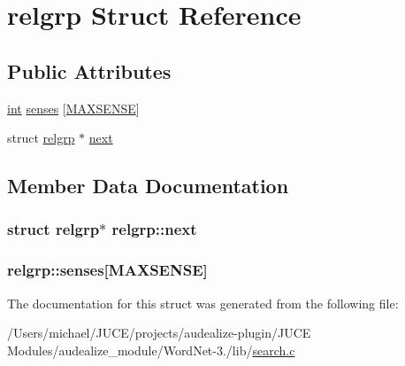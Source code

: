 \hypertarget{structrelgrp}{}\section{relgrp Struct Reference}
\label{structrelgrp}
\subsection*{Public Attributes}
\begin{DoxyCompactItemize}
\item 
\hyperlink{tk_8h_a83f82f76e7fed06f4c49d2db94028a6d}{int} \hyperlink{structrelgrp_adbaef9665fe24d3d15c9696c9cccc9b1}{senses} \mbox{[}\hyperlink{wn_8h_a42d3a85982c9dac42fdf1b7d9b2ddfd7}{M\+A\+X\+S\+E\+N\+SE}\mbox{]}
\item 
struct \hyperlink{structrelgrp}{relgrp} $\ast$ \hyperlink{structrelgrp_abf8e1b05d485e0585c143268293cdbb0}{next}
\end{DoxyCompactItemize}


\subsection{Member Data Documentation}
\subsubsection[{\texorpdfstring{next}{next}}]{\setlength{\rightskip}{0pt plus 5cm}struct {\bf relgrp}$\ast$ relgrp\+::next}\hypertarget{structrelgrp_abf8e1b05d485e0585c143268293cdbb0}{}\label{structrelgrp_abf8e1b05d485e0585c143268293cdbb0}
\subsubsection[{\texorpdfstring{senses}{senses}}]{ relgrp\+::senses\mbox{[}{\bf M\+A\+X\+S\+E\+N\+SE}\mbox{]}}\hypertarget{structrelgrp_adbaef9665fe24d3d15c9696c9cccc9b1}{}\label{structrelgrp_adbaef9665fe24d3d15c9696c9cccc9b1}


The documentation for this struct was generated from the following file\+:\begin{DoxyCompactItemize}
\item 
/\+Users/michael/\+J\+U\+C\+E/projects/audealize-\/plugin/\+J\+U\+C\+E Modules/audealize\+\_\+module/\+Word\+Net-\/3./lib/\hyperlink{search_8c}{search.\+c}\end{DoxyCompactItemize}
